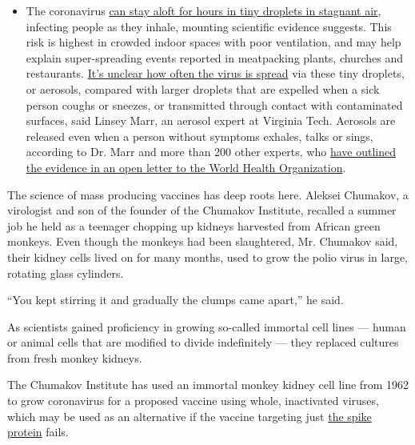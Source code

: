 \begin{itemize}
  \begin{itemize}
  \tightlist
  \item
    The coronavirus
    \href{https://www.nytimes.com/2020/07/04/health/239-experts-with-one-big-claim-the-coronavirus-is-airborne.html?action=click\&pgtype=Article\&state=default\&region=MAIN_CONTENT_3\&context=storylines_faq}{can
    stay aloft for hours in tiny droplets in stagnant air}, infecting
    people as they inhale, mounting scientific evidence suggests. This
    risk is highest in crowded indoor spaces with poor ventilation, and
    may help explain super-spreading events reported in meatpacking
    plants, churches and restaurants.
    \href{https://www.nytimes.com/2020/07/06/health/coronavirus-airborne-aerosols.html?action=click\&pgtype=Article\&state=default\&region=MAIN_CONTENT_3\&context=storylines_faq}{It's
    unclear how often the virus is spread} via these tiny droplets, or
    aerosols, compared with larger droplets that are expelled when a
    sick person coughs or sneezes, or transmitted through contact with
    contaminated surfaces, said Linsey Marr, an aerosol expert at
    Virginia Tech. Aerosols are released even when a person without
    symptoms exhales, talks or sings, according to Dr. Marr and more
    than 200 other experts, who
    \href{https://academic.oup.com/cid/article/doi/10.1093/cid/ciaa939/5867798}{have
    outlined the evidence in an open letter to the World Health
    Organization}.
  \end{itemize}
\end{itemize}

The science of mass producing vaccines has deep roots here. Aleksei
Chumakov, a virologist and son of the founder of the Chumakov Institute,
recalled a summer job he held as a teenager chopping up kidneys
harvested from African green monkeys. Even though the monkeys had been
slaughtered, Mr. Chumakov said, their kidney cells lived on for many
months, used to grow the polio virus in large, rotating glass cylinders.

``You kept stirring it and gradually the clumps came apart,'' he said.

As scientists gained proficiency in growing so-called immortal cell
lines --- human or animal cells that are modified to divide indefinitely
--- they replaced cultures from fresh monkey kidneys.

The Chumakov Institute has used an immortal monkey kidney cell line from
1962 to grow coronavirus for a proposed vaccine using whole, inactivated
viruses, which may be used as an alternative if the vaccine targeting
just
\href{https://www.nytimes.com/2020/07/28/health/coronavirus-mutation-spike-treatment.html?action=click\&module=Latest\&pgtype=Homepage}{the
spike protein} fails.

